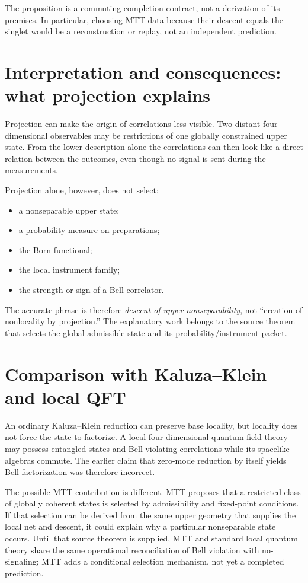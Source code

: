 \documentclass[11pt]{article}
\theoremstyle{remark}
\begin{document}
The proposition is a commuting completion contract, not a derivation of its
premises.  In particular, choosing MTT data because their descent equals the
singlet would be a reconstruction or replay, not an independent prediction.

\section{Interpretation and consequences: what projection explains}

Projection can make the origin of correlations less visible.  Two distant
four-dimensional observables may be restrictions of one globally constrained
upper state.  From the lower description alone the correlations can then look
like a direct relation between the outcomes, even though no signal is sent
during the measurements.

Projection alone, however, does not select:

\begin{itemize}
\item a nonseparable upper state;
\item a probability measure on preparations;
\item the Born functional;
\item the local instrument family;
\item the strength or sign of a Bell correlator.
\end{itemize}

The accurate phrase is therefore \emph{descent of upper nonseparability}, not
``creation of nonlocality by projection.''  The explanatory work belongs to
the source theorem that selects the global admissible state and its
probability/instrument packet.

\section{Comparison with Kaluza--Klein and local QFT}

An ordinary Kaluza--Klein reduction can preserve base locality, but locality
does not force the state to factorize.  A local four-dimensional quantum field
theory may possess entangled states and Bell-violating correlations while its
spacelike algebras commute.  The earlier claim that zero-mode reduction by
itself yields Bell factorization was therefore incorrect.

The possible MTT contribution is different.  MTT proposes that a restricted
class of globally coherent states is selected by admissibility and fixed-point
conditions.  If that selection can be derived from the same upper geometry
that supplies the local net and descent, it could explain why a particular
nonseparable state occurs.  Until that source theorem is supplied, MTT and
standard local quantum theory share the same operational reconciliation of
Bell violation with no-signaling; MTT adds a conditional selection mechanism,
not yet a completed prediction.
\end{document}
